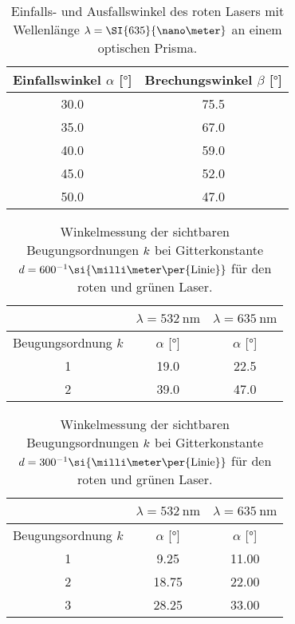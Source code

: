 \begin{table}
    \caption{Einfalls- und Ausfallswinkel des roten Lasers mit Wellenlänge $\protect \lambda = \SI{635}{\nano\meter}$ an einem optischen Prisma.}
    \centering
    \label{tab:prismared}
    \begin{tabular}{c c}
        \toprule
        Einfallswinkel $\alpha$ [$\si{\degree}$] & Brechungswinkel $\beta$ [$\si{\degree}$] \\
        \midrule
        30.0 & 75.5\\
        35.0 & 67.0\\  
        40.0 & 59.0\\
        45.0 & 52.0\\
        50.0 & 47.0\\
        \bottomrule    
    \end{tabular}
\end{table}

\begin{table}
    \centering
    \caption{Winkelmessung der sichtbaren Beugungsordnungen $\protect k$ bei Gitterkonstante $\protect d = {600^{-1}}\si{\milli\meter\per{\text{Linie}}}$ für den roten und grünen Laser.}
    \label{tab:600linien}
    \begin{tabular}{c || c | c }
        \multicolumn{1}{c}{~} &\multicolumn{1}{c}{$\lambda = \SI{532}{\nano\meter}$} & \multicolumn{1}{c}{$\lambda = \SI{635}{\nano\meter}$} \\
        \midrule
        Beugungsordnung $k$  & $\alpha$ [$\si{\degree}$]  & $\alpha$ [$\si{\degree}$] \\
        \midrule
        1    &   19.0     & 22.5 \\ 
        2    &   39.0     & 47.0 \\ 
        \bottomrule
    \end{tabular}
\end{table}

\begin{table}
    \centering
    \caption{Winkelmessung der sichtbaren Beugungsordnungen $\protect k$ bei Gitterkonstante $\protect d = {300^{-1}}\si{\milli\meter\per{\text{Linie}}}$ für den roten und grünen Laser.}
    \label{tab:300linien}
    \begin{tabular}{c || c | c }
        \multicolumn{1}{c}{~} &\multicolumn{1}{c}{$\lambda = \SI{532}{\nano\meter}$} & \multicolumn{1}{c}{$\lambda = \SI{635}{\nano\meter}$} \\
        \midrule
        Beugungsordnung $k$  & $\alpha$ [$\si{\degree}$]  & $\alpha$ [$\si{\degree}$] \\
        \midrule
        1    &    9.25    & 11.00 \\ 
        2    &   18.75    & 22.00 \\ 
        3    &   28.25    & 33.00 \\ 
        \bottomrule
    \end{tabular}
\end{table}

